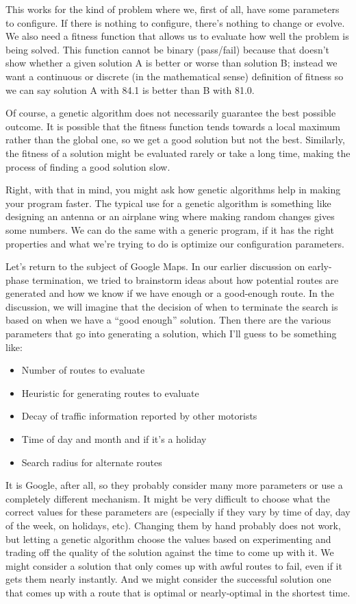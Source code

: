 \documentclass[a4paper]{report}
\begin{document}
This works for the kind of problem where we, first of all, have some parameters to configure. If there is nothing to configure, there's nothing to change or evolve. We also need a fitness function that allows us to evaluate how well the problem is being solved. This function cannot be binary (pass/fail) because that doesn't show whether a given solution A is better or worse than solution B; instead we want a continuous or discrete (in the mathematical sense) definition of fitness so we can say solution A with 84.1 is better than B with 81.0.

Of course, a genetic algorithm does not necessarily guarantee the best possible outcome. It is possible that the fitness function tends towards a local maximum rather than the global one, so we get a good solution but not the best. Similarly, the fitness of a solution might be evaluated rarely or take a long time, making the process of finding a good solution slow.

Right, with that in mind, you might ask how genetic algorithms help in making your program faster. The typical use for a genetic algorithm is something like designing an antenna or an airplane wing where making random changes gives some numbers. We can do the same with a generic program, if it has the right properties and what we're trying to do is optimize our configuration parameters.

Let's return to the subject of Google Maps. In our earlier discussion on early-phase termination, we tried to brainstorm ideas about how potential routes are generated and how we know if we have enough or a good-enough route. In the discussion, we will imagine that the decision of when to terminate the search is based on when we have a ``good enough'' solution. Then there are the various parameters that go into generating a solution, which I'll guess to be something like:

\begin{itemize}
	\item Number of routes to evaluate
	\item Heuristic for generating routes to evaluate
	\item Decay of traffic information reported by other motorists
	\item Time of day and month and if it's a holiday
	\item Search radius for alternate routes
\end{itemize}

It is Google, after all, so they probably consider many more parameters or use a completely different mechanism. It might be very difficult to choose what the correct values for these parameters are (especially if they vary by time of day, day of the week, on holidays, etc). Changing them by hand probably does not work, but letting a genetic algorithm choose the values based on experimenting and trading off the quality of the solution against the time to come up with it. We might consider a solution that only comes up with awful routes to fail, even if it gets them nearly instantly. And we might consider the successful solution one that comes up with a route that is optimal or nearly-optimal in the shortest time.
\end{document}
